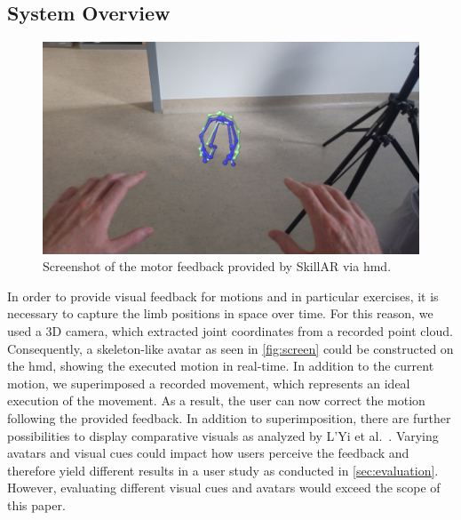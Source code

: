 \subsection{System Overview \label{sec:overview}}
\begin{figure}[h!]
	\centering
	\includegraphics[width=\linewidth]{pictures/HoloLensScreenshot.jpg}
	\caption[Screenshot of the egocentric motor feedback provided by SkillAR via \acrshort{hmd}.]{Screenshot of the motor feedback provided by SkillAR via \acrshort{hmd}. \label{fig:screen}}
\end{figure}
In order to provide visual feedback for motions and in particular exercises, it is necessary to capture the limb positions in space over time. For this reason, we used a 3D camera, which extracted joint coordinates from a recorded point cloud. Consequently, a skeleton-like avatar as seen in \autoref{fig:screen} could be constructed on the \acrshort{hmd}, showing the executed motion in real-time. In addition to the current motion, we superimposed a recorded movement, which represents an ideal execution of the movement. As a result, the user can now correct the motion following the provided feedback. In addition to superimposition, there are further possibilities to display comparative visuals as analyzed by L'Yi et al.~\cite{lyi2021comparative}. Varying avatars and visual cues could impact how users perceive the feedback and therefore yield different results in a user study as conducted in \autoref{sec:evaluation}. However, evaluating different visual cues and avatars would exceed the scope of this paper.


